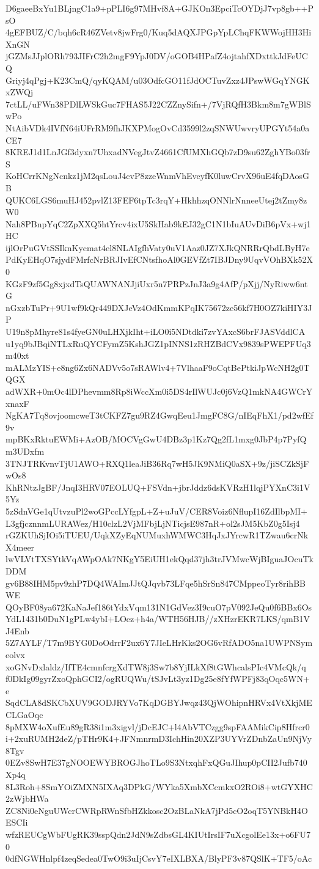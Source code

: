 D6gaeeBxYu1BLjngC1a9+pPLI6g97MHvf8A+GJKOn3EpciTcOYDjJ7vp8gb++PsO
4gEFBUZ/C/bqh6cR46ZVetv8jwFrg0/Kuq5dAQXJPGpYpLChqFKWWojHH3HiXnGN
jGZMsJJplORh793JIFrC2h2mgF9YpJ0DV/oGOB4HPafZ4ojtahfXDxttkJdFeUCQ
Griyj4qPgj+K23CmQ/qyKQAM/u03OdfcGO11fJdOCTuvZxz4JPswWGqYNGKxZWQj
7ctLL/uFWn38PDlLWSkGuc7FHAS5J22CZZnySifn+/7VjRQfH3Bkm8m7gWBlSwPo
NtAibVDk4IVfN64iUFrRM9fhJKXPMogOvCd3599l2zqSNWUwvryUPGYt54a0aCE7
8KREJ1d1LnJGf3dyxn7UhxadNVegJtvZ4661CfUMXhGQb7zD9su62ZghYBo03frS
KoHCrrKNgNcnkz1jM2qsLouJ4cvP8zzeWnmVhEveyfK0luwCrvX96uE4fqDAosGB
QUKC6LGS6muHJ452pvlZ13FEF6tpTc3rqY+HkhhzqONNlrNnneeUtej2tZmy8zW0
Nah8PBnpYqC2ZpXXQ5htYrcv4ixU5SkHab9kEJ32gC1N1bIuAUvDiB6pVx+wj1HC
ijlOrPuGVtSSIknKycmat4el8NLAIgfhVaty0uV1Aaz0JZ7XJkQNRRrQbdLByH7e
PdKyEHqO7sjydFMrfcNrBRJIvEfCNtsfhoAl0GEVfZt7IBJDny9UqvVOhBXk52X0
KGzF9zf5Gg8xjxdTsQUAWNANJjiUxr5n7PRPzJnJ3a9g4AfP/pXjj/NyRiww6ntG
nGxzbTuPr+9U1wf9kQr449DXJeVz4OdKmmKPqIK75672ze56kf7H0OZ7kiHIY3JP
U19n8pMhyre81s4fyeGN0uLHXjkIht+iLO0i5NDtdki7zvYAxcS6brFJASVddlCA
u1yq9bJBqiNTLxRuQYCFymZ5KshJGZ1pINNS1zRHZBdCVx9839sPWEPFUq3m40xt
mALMzYIS+e8ng6Zx6NADVv5o7sRAWlv4+7VlhaaF9oCqtBePtkiJpWcNH2g0TQGX
adWXR+0mOc4lDPhevmm8Rp8iWccXm0i5DS4rIlWUJc0j6VzQ1mkNA4GWCrYxnaxF
NgKA7Tq8ovjoomcweT3tCKFZ7gu9RZ4GwqEeu1JmgFC8G/nIEqFhX1/pd2wfEf9v
mpBKxRktuEWMi+AzOB/MOCVgGwU4DBz3p1Kz7Qg2fL1mxg0JbP4p7PyfQm3UDxfm
3TNJTRKvnvTjU1AWO+RXQ1leaJiB36Rq7wH5JK9NMiQ0aSX+9z/jiSCZkSjFwOs8
KhRNtzJgBF/JnqI3HRV07EOLUQ+FSVdn+jbrJddz6dsKVRzH1lqjPYXnC3i1V5Yz
5zSdnVGe1qUtvzuPl2woGPccLYfgpL+Z+uJuV/CER8Voiz6NflupI16ZdIlbpMI+
L3gfjcznnmLURAWez/H10clzL2VjMFbjLjNTicjsE987nR+ol2sJM5KbZ0g5Isj4
rGZKUhSjIOi5iTUEU/UqkXZyEqNUMuxhWMWC3HqJxJYrcwR1TZwau6crNkX4meer
lwVLVtTXSYtkVqAWpOAk7NKgY5EiUH1ekQqd37jh3trJVMwcWjBIguaJOcuTkDDM
gv6B88IHM5pv9zhP7DQ4WAImJJtQJqvb73LFqe5hSrSn847CMppeoTyr8rihBBWE
QOyBF08ya672KaNaJef186tYdxVqm131N1GdVez3I9cuO7pV092JeQu0f6BBx6Os
YdL1431b0DuN1gPLw4ybI+LOez+h4a/WTH56HJB//zXHzrEKR7LKS/qmB1VJ4Enb
5Z7AYLF/T7m9BYG0DoOdrrF2ux6Y7JIeLHrKks2OG6vRfADO5na1UWPNSymeolvx
xoGNvDxlaldz/IfTE4cmnfcrgXdTW8j3Sw7b8YjILkXf8tGWhcalsPIc4VMcQk/q
f0DkIg09gyrZxoQphGCI2/ogRUQWu/tSJvLt3yz1Dg25e8fYfWPFj83qOqc5WN+e
SqdCLA8dSKCbXUV9GODJRYVo7KqDGBYJwqz43QjWOhipnHRVx4VtXkjMECLGaOqc
8pMXW4oXufEu89gR38i1m3xigvl/jDcEJC+l4AbVTCzgg9spFAAMikCip8Hfrcr0
i+2xuRUMH2deZ/pTHr9K4+JFNmnrmD3IchHin20XZP3UYVrZDnbZaUn9NjVy8Tgv
0EZv8SwH7E37gNOOEWYBROGJhoTLo9S3NtxqhFxQGuJIhup0pCII2Jufb740Xp4q
8L3Roh+8SmYOiZMXN5IXAq3DPkG/WYka5XmbXCcmkxO2ROi8+wtGYXHC2zWjbHWa
ZC8Ni0eNguUWcrCWRpRWnSfbHZkkosc2OzBLaNkA7jPd5cO2oqT5YNBkH4OESCIi
wfzREUCgWbFUgRK39sspQdn2JdN9sZdbsGL4KIUtIrsIF7uXcgolEe13x+o6FU70
0dfNGWHnlpf4zeqSedea0TwO9i3uIjCsvY7eIXLBXA/BlyPF3v87QSlK+TF5/oAc

